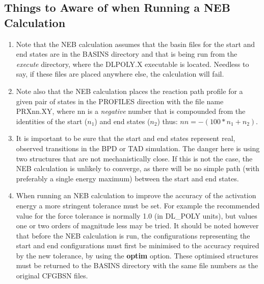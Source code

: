 \subsection{Things to Aware of when Running a NEB Calculation}

\begin{enumerate}
\item Note that the NEB calculation assumes that the basin files for
the start and end states are in the BASINS directory and that \D{} is
being run from the {\em execute} directory, where the DLPOLY.X
executable is located. Needless to say, if these files are placed
anywhere else, the calculation will fail. 
\item Note also that the NEB
calculation places the reaction path profile for a given pair of
states in the PROFILES direction with the file name PRXnn.XY, where {nn}
is a {\em negative} number that is compounded from the identities of the
start ($n_1$) and end states ($n_2$) thus: $nn=-(100*n_1+n_2)$.
\item It is important to be sure that the start and end states
represent real, observed transitions in the BPD or TAD simulation. The
danger here is using two structures that are not mechanistically
close. If this is not the case, the NEB calculation is unlikely to
converge, as there will be no simple path (with preferably a single
energy maximum) between the start and end states.
\item When running an NEB calculation to improve the
accuracy of the activation energy a more stringent tolerance must be
set. For example the recommended value for the force tolerance is
normally 1.0 (in DL\_POLY units), but values one or two orders of
magnitude less may be tried. It should be noted however that before
the NEB calculation is run, the configurations representing the start
and end configurations must first be minimised to the accuracy
required by the new tolerance, by using the \D{} {\bf optim}
option. These optimised structures must be returned to the BASINS
directory with the same file numbers as the original CFGBSN files.
\end{enumerate}


